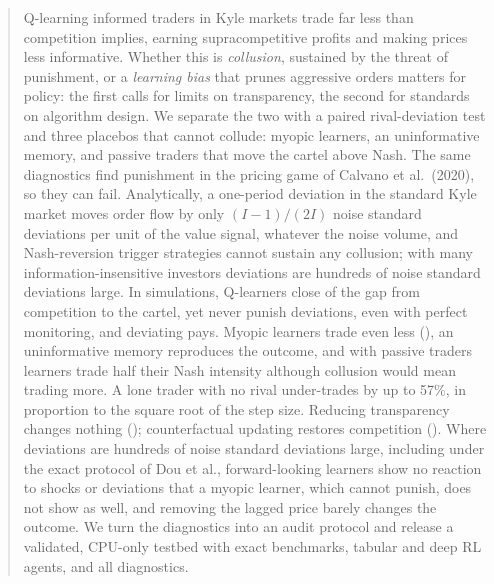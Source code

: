 \begin{abstract}
Q-learning informed traders in Kyle markets trade far less than competition
implies, earning supracompetitive profits and making prices less informative.
Whether this is \emph{collusion}, sustained by the threat of punishment, or a
\emph{learning bias} that prunes aggressive orders matters for policy: the
first calls for limits on transparency, the second for standards on algorithm
design. We separate the two with a paired rival-deviation test and three
placebos that cannot collude: myopic learners, an uninformative memory, and
passive traders that move the cartel above Nash. The same diagnostics find
punishment in the pricing game of Calvano et al.\ (2020), so they can fail.
Analytically, a one-period deviation in the standard Kyle market moves order
flow by only $(I-1)/(2I)$ noise standard deviations per unit of the value
signal, whatever the noise volume, and Nash-reversion trigger strategies
cannot sustain any collusion; with many information-insensitive investors
deviations are hundreds of noise standard deviations large. In simulations, Q-learners close \ResidDeltaInt{} of the gap from
competition to the cartel, yet never punish deviations, even with perfect
monitoring, and deviating pays. Myopic learners trade even less
(\MyopicResidDeltaInt{}), an uninformative memory reproduces the outcome, and
with passive traders learners trade half their Nash intensity although
collusion would mean trading more. A lone trader with no rival under-trades by
up to 57\%, in proportion to the square root of the step size. Reducing
transparency changes nothing (\OpaqueDeltaInt{}); counterfactual updating
restores competition (\CfResidDeltaInt{}). Where deviations are hundreds of noise standard deviations large, including
under the exact protocol of Dou et al., forward-looking learners show no
reaction to shocks or deviations that a myopic learner, which cannot punish,
does not show as well, and removing the lagged price barely changes the
outcome. We turn the diagnostics into an audit protocol and release a
validated, CPU-only testbed with exact benchmarks, tabular and deep RL agents,
and all diagnostics.
\end{abstract}

